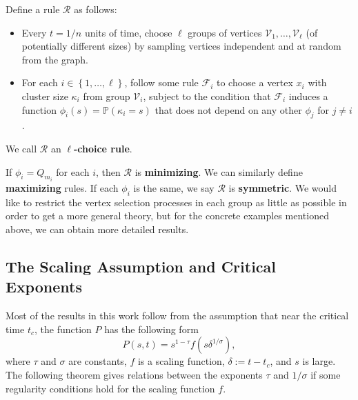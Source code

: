 \documentclass[twoside,10pt]{article}
\begin{document}
\begin{defn}[]
        Define a rule $\mathcal{R}$ as follows:
        \begin{itemize}
                \item Every $t=1/n$ units of time, choose $\ell$ groups of vertices $\mathcal{V}_1, \dots, \mathcal{V}_{\ell}$ (of potentially different sizes) by sampling vertices independent and at random from the graph.
                \item For each $i \in \left\{ 1, \dots, \ell \right\}$, follow some rule $\mathcal{F}_{i}$ to choose a vertex $x_i$ with cluster size $\kappa_i$ from group $\mathcal{V}_i$, subject to the condition that $\mathcal{F}_i$ induces a function $\phi_i(s) = \mathbb{P}\left( \kappa_i=s \right) $ that does not depend on any other $\phi_j$ for $j \neq i$.
        \end{itemize}
We call $\mathcal{R}$ an \textbf{$\ell$-choice rule}.
\end{defn}

If $\phi_{i}=Q_{m_i}$ for each $i$, then $\mathcal{R}$ is \textbf{minimizing}. We can similarly define \textbf{maximizing} rules. If each $\phi_i$ is the same, we say $\mathcal{R}$ is \textbf{symmetric}. We would like to restrict the vertex selection processes in each group as little as possible in order to get a more general theory, but for the concrete examples mentioned above, we can obtain more detailed results.

\subsection{The Scaling Assumption and Critical Exponents}

Most of the results in this work follow from the assumption that near the critical time $t_c$, the function $P$ has the following form
\begin{equation}
	\label{scaling-assumption}
        P(s, t) = s^{1-\tau}f(s \delta^{1/\sigma}),
\end{equation}
where $\tau$ and $\sigma$ are constants, $f$ is a scaling function, $\delta:= t-t_{c}$, and $s$ is large. The following theorem gives relations between the exponents $\tau$ and $1/\sigma$ if some regularity conditions hold for the scaling function $f$.
\end{document}
